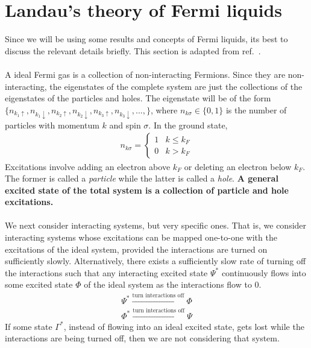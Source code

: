 \documentclass[twoside]{report}
\numberwithin{equation}{section}
\begin{document}
\section{Landau's theory of Fermi liquids}
Since we will be using some results and concepts of Fermi liquids, its best to discuss the relevant details briefly. This section is adapted from ref.~\cite{pethick}. 
\\\\A ideal Fermi gas is a collection of non-interacting Fermions.
Since they are non-interacting, the eigenstates of the complete system are just the collections of the eigenstates of the particles and holes.
The eigenstate will be of  the form \(\{n_{k_1\uparrow},n_{k_1\downarrow},n_{k_2\uparrow},n_{k_2\downarrow},n_{k_3\uparrow},n_{k_3\downarrow},...,\}\), where \(n_{k\sigma}\in\{0,1\}\) is the number of particles with momentum \(k\) and spin \(\sigma\).
In the ground state,
\begin{equation}\begin{aligned}
n_{k\sigma} = \begin{cases} 1 & k \leq k_F \\ 0 & k>k_F \end{cases} 
\end{aligned}\end{equation}
Excitations involve adding an electron above \(k_F\) or deleting an electron below \(k_F\).
The former is called a \textit{particle} while the latter is called a \textit{hole}.
\textbf{A general excited state of the total system is a collection of particle and hole excitations.}\\\\
We next consider interacting systems, but very specific ones.
That is, we consider interacting systems whose excitations can be mapped one-to-one with the excitations of the ideal system, provided the interactions are turned on sufficiently slowly.
Alternatively, there exists a sufficiently slow rate of turning off the interactions such that any interacting excited state \(\Psi^*\) continuously flows into some excited state \(\Phi\) of the ideal system as the interactions flow to 0.
\begin{gather}
\Psi^* \xrightarrow{\text{turn interactions off}} \Phi \\
\Phi^* \xrightarrow{\text{turn interactions off}} \Psi
\end{gather}
If some state \(\Gamma^*\), instead of flowing into an ideal excited state, gets lost while the interactions are being turned off, then we are not considering that system.
\end{document}
